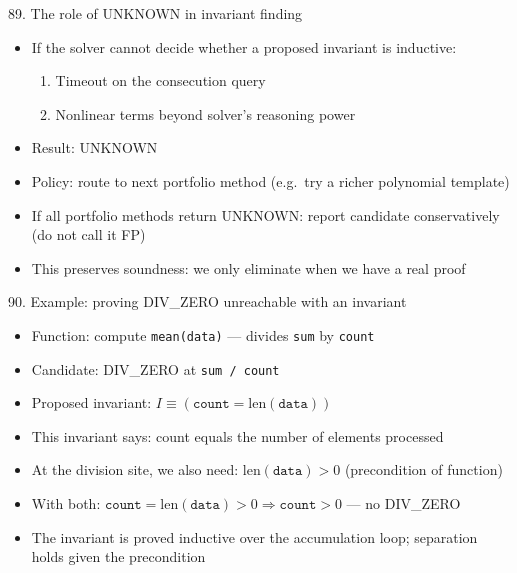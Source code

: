 \documentclass[aspectratio=169]{beamer}
\begin{document}
\begin{frame}{89. The role of UNKNOWN in invariant finding}
\begin{itemize}
  \item If the solver cannot decide whether a proposed invariant is inductive:
    \begin{enumerate}
      \item Timeout on the consecution query
      \item Nonlinear terms beyond solver's reasoning power
    \end{enumerate}
  \item Result: UNKNOWN
  \item Policy: route to next portfolio method (e.g.\ try a richer polynomial template)
  \item If all portfolio methods return UNKNOWN: report candidate conservatively (do not call it FP)
  \item This preserves soundness: we only eliminate when we have a real proof
\end{itemize}
\end{frame}

\begin{frame}{90. Example: proving DIV\_ZERO unreachable with an invariant}
\begin{itemize}
  \item Function: compute \texttt{mean(data)} --- divides \texttt{sum} by \texttt{count}
  \item Candidate: DIV\_ZERO at \texttt{sum / count}
  \item Proposed invariant: \(I \equiv (\texttt{count} = \text{len}(\texttt{data}))\)
  \item This invariant says: count equals the number of elements processed
  \item At the division site, we also need: \(\text{len}(\texttt{data}) > 0\) (precondition of function)
  \item With both: \(\texttt{count} = \text{len}(\texttt{data}) > 0 \Rightarrow \texttt{count} > 0\) --- no DIV\_ZERO
  \item The invariant is proved inductive over the accumulation loop; separation holds given the precondition
\end{itemize}
\end{frame}
\end{document}
